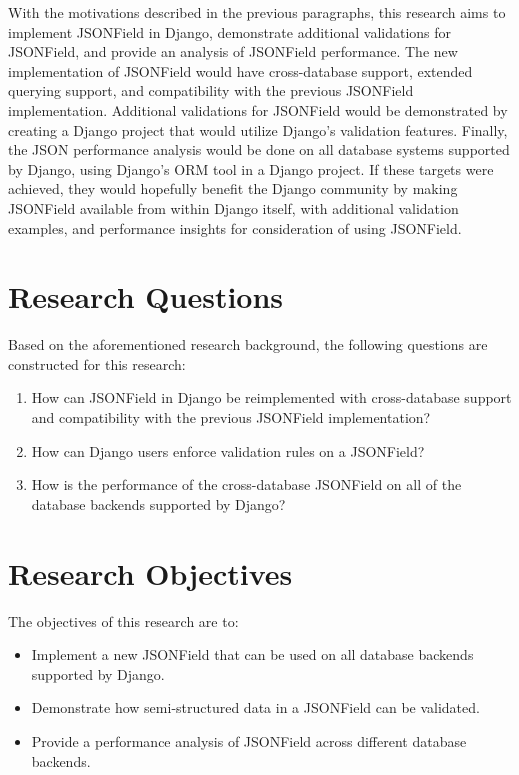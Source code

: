 With the motivations described in the previous paragraphs, this research aims
to implement JSONField in Django, demonstrate additional validations for
JSONField, and provide an analysis of JSONField performance. The new
implementation of JSONField would have cross-database support, extended
querying support, and compatibility with the previous JSONField implementation.
Additional validations for JSONField would be demonstrated by creating a Django
project that would utilize Django's validation features. Finally, the JSON
performance analysis would be done on all database systems supported by Django,
using Django's ORM tool in a Django project. If these targets were achieved,
they would hopefully benefit the Django community by making JSONField available
from within Django itself, with additional validation examples, and performance
insights for consideration of using JSONField.

\section{Research Questions}

Based on the aforementioned research background, the following questions are
constructed for this research:

\begin{enumerate}
    \item How can JSONField in Django be reimplemented with cross-database
          support and compatibility with the previous JSONField implementation?
    \item How can Django users enforce validation rules on a JSONField?
    \item How is the performance of the cross-database JSONField on all of the
          database backends supported by Django?
\end{enumerate}

\section{Research Objectives}

The objectives of this research are to:

\begin{itemize}
    \item Implement a new JSONField that can be used on all database backends
          supported by Django.
    \item Demonstrate how semi-structured data in a JSONField can be validated.
    \item Provide a performance analysis of JSONField across different database
          backends.
\end{itemize}

